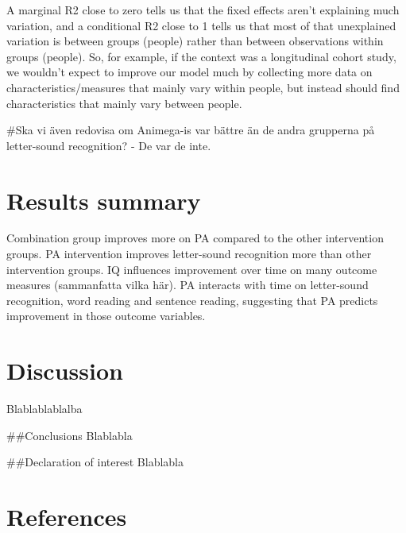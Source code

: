 \documentclass[
  english,
  ,man]{apa6}
\begin{document}
A marginal R2 close to zero tells us that the fixed effects aren't explaining much variation, and a conditional R2 close to 1 tells us that most of that unexplained variation is between groups (people) rather than between observations within groups (people). So, for example, if the context was a longitudinal cohort study, we wouldn't expect to improve our model much by collecting more data on characteristics/measures that mainly vary within people, but instead should find characteristics that mainly vary between people.

\#Ska vi även redovisa om Animega-is var bättre än de andra grupperna på letter-sound recognition? - De var de inte.

\hypertarget{results-summary}{%
\section{Results summary}\label{results-summary}}

Combination group improves more on PA compared to the other intervention groups. PA intervention improves letter-sound recognition more than other intervention groups. IQ influences improvement over time on many outcome measures (sammanfatta vilka här). PA interacts with time on letter-sound recognition, word reading and sentence reading, suggesting that PA predicts improvement in those outcome variables.

\hypertarget{discussion}{%
\section{Discussion}\label{discussion}}

Blablablablalba

\#\#Conclusions
Blablabla

\#\#Declaration of interest
Blablabla

\newpage

\hypertarget{references}{%
\section{References}\label{references}}

\begingroup
\setlength{\parindent}{-0.5in}
\setlength{\leftskip}{0.5in}
\end{document}
